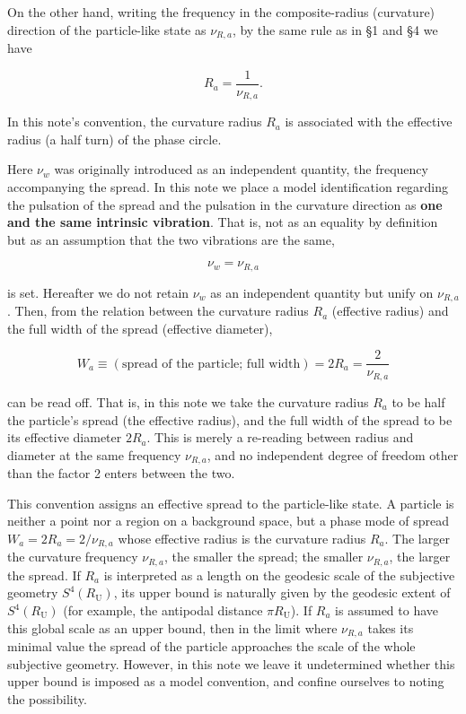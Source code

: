 \documentclass[
]{article}
\begin{document}
On the other hand, writing the frequency in the composite-radius
(curvature) direction of the particle-like state as \(\nu_{R,a}\), by
the same rule as in §1 and §4 we have

\[R_a=\frac{1}{\nu_{R,a}}.\]

In this note's convention, the curvature radius \(R_a\) is associated
with the effective radius (a half turn) of the phase circle.

Here \(\nu_w\) was originally introduced as an independent quantity, the
frequency accompanying the spread. In this note we place a model
identification regarding the pulsation of the spread and the pulsation
in the curvature direction as \textbf{one and the same intrinsic
vibration}. That is, not as an equality by definition but as an
assumption that the two vibrations are the same,

\[\boxed{\ \nu_w=\nu_{R,a}\ }\]

is set. Hereafter we do not retain \(\nu_w\) as an independent quantity
but unify on \(\nu_{R,a}\). Then, from the relation between the
curvature radius \(R_a\) (effective radius) and the full width of the
spread (effective diameter),

\[\boxed{\ W_a\equiv(\text{spread of the particle; full width})=2R_a=\frac{2}{\nu_{R,a}}\ }\]

can be read off. That is, in this note we take the curvature radius
\(R_a\) to be half the particle's spread (the effective radius), and the
full width of the spread to be its effective diameter \(2R_a\). This is
merely a re-reading between radius and diameter at the same frequency
\(\nu_{R,a}\), and no independent degree of freedom other than the
factor 2 enters between the two.

This convention assigns an effective spread to the particle-like state.
A particle is neither a point nor a region on a background space, but a
phase mode of spread \(W_a=2R_a=2/\nu_{R,a}\) whose effective radius is
the curvature radius \(R_a\). The larger the curvature frequency
\(\nu_{R,a}\), the smaller the spread; the smaller \(\nu_{R,a}\), the
larger the spread. If \(R_a\) is interpreted as a length on the geodesic
scale of the subjective geometry \(S^4(R_{\mathrm U})\), its upper bound
is naturally given by the geodesic extent of \(S^4(R_{\mathrm U})\) (for
example, the antipodal distance \(\pi R_{\mathrm U}\)). If \(R_a\) is
assumed to have this global scale as an upper bound, then in the limit
where \(\nu_{R,a}\) takes its minimal value the spread of the particle
approaches the scale of the whole subjective geometry. However, in this
note we leave it undetermined whether this upper bound is imposed as a
model convention, and confine ourselves to noting the possibility.
\end{document}
